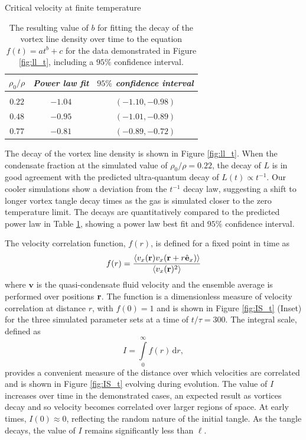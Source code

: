 \begin{chapter}{\label{cha:nonequib}Critical velocity at finite temperature}
\begin{table}
\centering
\begin{tabular}{ccc}
{\it $\rho_0/\rho$} & {\it Power law fit} & {\it $95\%$ confidence interval} \\
\hline \\ [-2ex]
$0.22$ & $-1.04$ & $(-1.10, -0.98)$\\
$0.48$ & $-0.95$ & $(-1.01, -0.89)$\\
$0.77$ & $-0.81$ & $(-0.89, -0.72)$\\
\hline
\end{tabular}
\caption{The resulting value of $b$ for fitting the decay of the vortex line density over time to the equation $f(t) = at^b+c$ for the data demonstrated in Figure \ref{fig:ll_t}, including a $95\%$ confidence interval.}
\label{tbl:fits}
\end{table}

The decay of the vortex line density is shown in Figure \ref{fig:ll_t}. When the condensate fraction at the simulated value of $\rho_0/\rho = 0.22$, the decay of $L$ is in good agreement with the predicted ultra-quantum decay of $L(t) \propto t^{-1}$. Our cooler simulations show a deviation from the $t^{-1}$ decay law, suggesting a shift to longer vortex tangle decay times as the gas is simulated closer to the zero temperature limit. The decays are quantitatively compared to the predicted power law in Table \ref{tbl:fits}, showing a power law best fit and $95\%$ confidence interval.

The velocity correlation function, $f(r)$, is defined for a fixed point in time as
\begin{equation}
f(r) = \frac{\langle v_x({\bf r})v_x({\bf r} +  r\hat{\bf e}_x) \rangle}{\langle v_x({\bf r})^2 \rangle}
\end{equation}
where $\mathbf{v}$ is the quasi-condensate fluid velocity and the ensemble average is performed over positions ${\bf r}$. The function is a dimensionless measure of velocity correlation at distance $r$, with $f(0)=1$ and is shown in Figure \ref{fig:IS_t} (Inset) for the three simulated parameter sets at a time of $t/\tau = 300$. The integral scale, defined as
\begin{equation}
I = \int\limits_0^\infty\! f(r)\, \mathrm{d}r,
\end{equation}
provides a convenient measure of the distance over which velocities are correlated and is shown in Figure \ref{fig:IS_t} evolving during evolution. The value of $I$ increases over time in the demonstrated cases, an expected result as vortices decay and so velocity becomes correlated over larger regions of space. At early times, $I(0)\approx0$, reflecting the random nature of the initial tangle. As the tangle decays, the value of $I$ remains significantly less than $\ell$.



\end{chapter}
